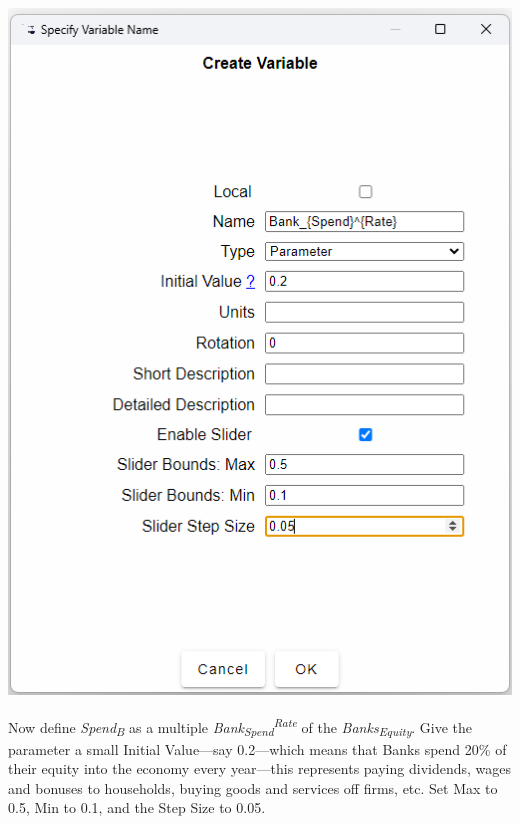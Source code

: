 \includegraphics{images/MonetaryModel01GodleyTable05DefineFlows04}

Now define \emph{Spend}\textsubscript{\emph{B}} as a multiple \emph{Bank}\textsubscript{\emph{Spend}}\emph{}\textsuperscript{\emph{Rate}}
of the \emph{Banks}\textsubscript{\emph{Equity}}. Give the parameter
a small Initial Value---say 0.2---which means that Banks spend 20\%
of their equity into the economy every year---this represents paying
dividends, wages and bonuses to households, buying goods and services
off firms, etc. Set Max to 0.5, Min to 0.1, and the Step Size to 0.05.

